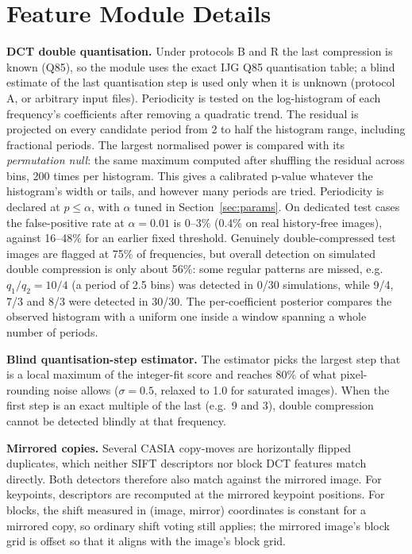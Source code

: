 \section{Feature Module Details}\label{app:method}

\textbf{DCT double quantisation.} Under protocols B and R the last compression is known (Q85), so the module uses
the exact IJG Q85 quantisation table; a blind estimate of the last quantisation step is used only when it is
unknown (protocol A, or arbitrary input files). Periodicity is tested on the log-histogram of each frequency's
coefficients after removing a quadratic trend. The residual is projected on every candidate period from 2 to half
the histogram range, including fractional periods. The largest normalised power is compared with its
\emph{permutation null}: the same maximum computed after shuffling the residual across bins, 200 times per
histogram. This gives a calibrated p-value whatever the histogram's width or tails, and however many periods are
tried. Periodicity is declared at $p\leq\alpha$, with $\alpha$ tuned in Section~\ref{sec:params}. On dedicated test
cases the false-positive rate at $\alpha = 0.01$ is 0--3\% (0.4\% on real history-free images), against 16--48\%
for an earlier fixed threshold. Genuinely double-compressed test images are flagged at 75\% of frequencies, but
overall detection on simulated double compression is only about 56\%: some regular patterns are missed, e.g.\
$q_1/q_2 = 10/4$ (a period of 2.5 bins) was detected in 0/30 simulations, while 9/4, 7/3 and 8/3 were detected in
30/30. The per-coefficient posterior compares the observed histogram with a uniform one inside a window spanning a
whole number of periods.

\textbf{Blind quantisation-step estimator.} The estimator picks the largest step that is a local maximum of the
integer-fit score and reaches 80\% of what pixel-rounding noise allows ($\sigma = 0.5$, relaxed to 1.0 for
saturated images). When the first step is an exact multiple of the last (e.g.\ 9 and 3), double compression cannot
be detected blindly at that frequency.

\textbf{Mirrored copies.} Several CASIA copy-moves are horizontally flipped duplicates, which neither SIFT
descriptors nor block DCT features match directly. Both detectors therefore also match against the mirrored image.
For keypoints, descriptors are recomputed at the mirrored keypoint positions. For blocks, the shift measured in
(image, mirror) coordinates is constant for a mirrored copy, so ordinary shift voting still applies; the mirrored
image's block grid is offset so that it aligns with the image's block grid.

